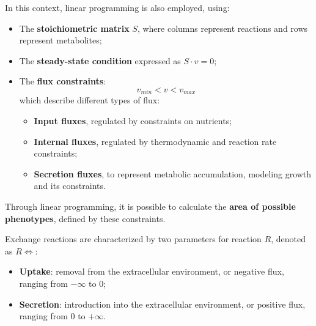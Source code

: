 In this context, linear programming is also employed, using:
\begin{itemize}
    \item The \textbf{stoichiometric matrix} $S$, where columns represent reactions and rows 
        represent metabolites;
    \item The \textbf{steady-state condition} expressed as $S \cdot v = 0$;
    \item The \textbf{flux constraints}:
        \begin{equation*}
            v_{min} < v < v_{max}
        \end{equation*}
        which describe different types of flux:
        \begin{itemize}
            \item \textbf{Input fluxes}, regulated by constraints on nutrients;
            \item \textbf{Internal fluxes}, regulated by thermodynamic and reaction 
                rate constraints;
            \item \textbf{Secretion fluxes}, to represent metabolic accumulation, modeling 
                growth and its constraints.
        \end{itemize}
\end{itemize}

Through linear programming, it is possible to calculate the \textbf{area of possible phenotypes}, 
defined by these constraints.

Exchange reactions are characterized by two parameters for reaction $R$, denoted as $R \Longleftrightarrow$:
\begin{itemize}
    \item \textbf{Uptake}: removal from the extracellular environment, or negative flux, 
        ranging from $-\infty$ to $0$;
    \item \textbf{Secretion}: introduction into the extracellular environment, or positive flux, 
        ranging from $0$ to $+\infty$.
\end{itemize}

